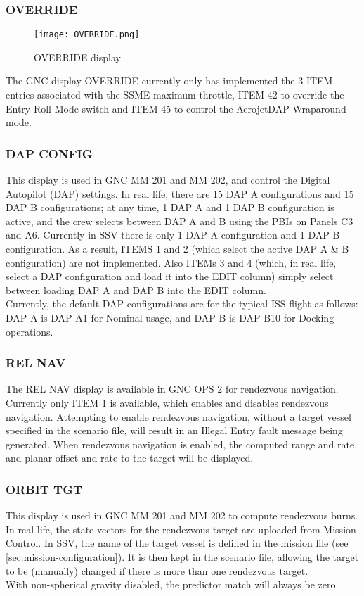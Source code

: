\documentclass[Space_Shuttle_Vessel_Manual.tex]{subfiles}
\begin{document}
\begin{multicols*}{2}
\subsubsection{OVERRIDE}
\begin{figure}[H]
  \texttt{[image: OVERRIDE.png]}
  \caption{OVERRIDE display}
  \label{fig:OVERRIDE}
\end{figure}
The GNC display OVERRIDE currently only has implemented the 3 ITEM entries associated with the SSME maximum throttle, ITEM 42 to override the Entry Roll Mode switch and ITEM 45 to control the AerojetDAP Wraparound mode.

\subsubsection{DAP CONFIG}
This display is used in GNC MM 201 and MM 202, and control the Digital Autopilot (DAP) settings. In real life, there are 15 DAP A configurations and 15 DAP B configurations; at any time, 1 DAP A and 1 DAP B configuration is active, and the crew selects between DAP A and B using the PBIs on Panels C3 and A6. Currently in SSV there is only 1 DAP A configuration and 1 DAP B configuration. As a result, ITEMS 1 and 2 (which select the active DAP A \& B configuration) are not implemented. Also ITEMs 3 and 4 (which, in real life, select a DAP configuration and load it into the EDIT column) simply select between loading DAP A and DAP B into the EDIT column.\\
Currently, the default DAP configurations are for the typical ISS flight as follows: DAP A is DAP A1 for Nominal usage, and DAP B is DAP B10 for Docking operations.

\subsubsection{REL NAV}
The REL NAV display is available in GNC OPS 2 for rendezvous navigation. Currently only ITEM 1 is available, which enables and disables rendezvous navigation. Attempting to enable rendezvous navigation, without a target vessel specified in the scenario file, will result in an Illegal Entry fault message being generated. When rendezvous navigation is enabled, the computed range and rate, and planar offset and rate to the target will be displayed.

\subsubsection{ORBIT TGT}
This display is used in GNC MM 201 and MM 202 to compute rendezvous burns. In real life, the state vectors for the rendezvous target are uploaded from Mission Control. In SSV, the name of the target vessel is defined in the mission file (see \ref{sec:mission-configuration}). It is then kept in the scenario file, allowing the target to be (manually) changed if there is more than one rendezvous target.\\
With non-spherical gravity disabled, the predictor match will always be zero.


\end{multicols*}
\end{document}
